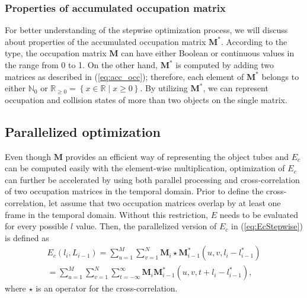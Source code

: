 \documentclass[11pt]{hyu_thesis}
\begin{document}
\subsubsection{Properties of accumulated occupation matrix}
For better understanding of the stepwise optimization process, we will discuss about properties of the accumulated occupation matrix $\textbf{M}^{*}$. According to the type, the occupation matrix $\textbf{M}$ can have either Boolean or continuous values in the range from 0 to 1. On the other hand, $\textbf{M}^{*}$ is computed by adding two matrices as described in (\ref{eq:acc_occ}); therefore, each element of $\textbf{M}^{*}$ belongs to either $\mathbb{N}_{0}$ or $\mathbb{R}_{\geq 0}=\left\{ x \in \mathbb{R} \mid x \geq 0  \right\}$. By utilizing $\textbf{M}^{*}$, we can represent occupation and collision states of more than two objects on the single matrix.

\subsection{Parallelized optimization}
Even though $\textbf{M}$ provides an efficient way of representing the object tubes and $E_c$ can be computed easily with the element-wise multiplication, optimization of $E_c$ can further be accelerated by using both parallel processing and cross-correlation of two occupation matrices in the temporal domain. Prior to define the cross-correlation, let assume that two occupation matrices overlap by at least one frame in the temporal domain. Without this restriction, $E$ needs to be evaluated for every possible $l$ value. Then, the parallelized version of $E_c$ in (\ref{eq:EcStepwise}) is defined as
\begin{equation}
\label{eq:EcPP}
\begin{aligned}
E_c(l_i, L_{i-1}) = \sum_{u=1}^{M} \sum_{v=1}^{N} \textbf{M}_{i} \star \textbf{M}_{i-1}^{*}(u, v, l_i - l_{i-1}^{*}) \\
= \sum_{u=1}^{M} \sum_{v=1}^{N} \sum_{t=-\infty}^{\infty} \textbf{M}_{i}\textbf{M}_{i-1}^{*}(u, v, t + l_i - l_{i-1}^{*}),
\end{aligned}
\end{equation}
where $\star$ is an operator for the cross-correlation.
\end{document}
